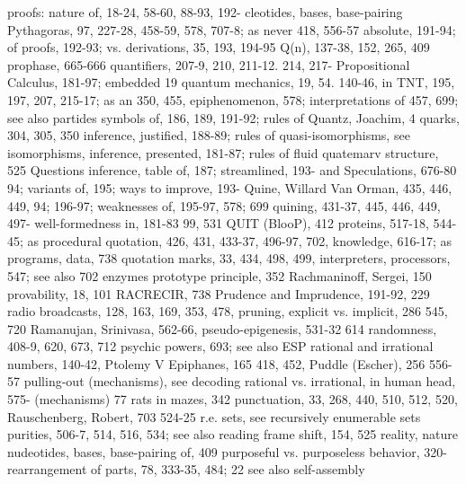 proofs: nature of, 18-24, 58-60, 88-93, 192-   cleotides, bases, base-pairing Pythagoras,
97, 227-28, 458-59, 578, 707-8; as never       418, 556-57
absolute, 191-94; of proofs, 192-93; vs.
derivations, 35, 193, 194-95                   Q(n), 137-38, 152, 265, 409
prophase, 665-666                              quantifiers, 207-9, 210, 211-12. 214, 217-
Propositional Calculus, 181-97; embedded       19 quantum mechanics, 19, 54. 140-46,
in TNT, 195, 197, 207, 215-17; as an           350, 455,
epiphenomenon, 578; interpretations of         457, 699; see also partides
symbols of, 186, 189, 191-92; rules of         Quantz, Joachim, 4 quarks, 304, 305, 350
inference, justified, 188-89; rules of         quasi-isomorphisms, see isomorphisms,
inference, presented, 181-87; rules of         fluid quatemarv structure, 525 Questions
inference, table of, 187; streamlined, 193-    and Speculations, 676-80
94; variants of, 195; ways to improve, 193-    Quine, Willard Van Orman, 435, 446, 449,
94; 196-97; weaknesses of, 195-97, 578;        699 quining, 431-37, 445, 446, 449, 497-
well-formedness in, 181-83                     99, 531 QUIT (BlooP), 412
proteins, 517-18, 544-45; as procedural        quotation, 426, 431, 433-37, 496-97, 702,
knowledge, 616-17; as programs, data,          738 quotation marks, 33, 434, 498, 499,
interpreters, processors, 547; see also        702
enzymes
prototype principle, 352                       Rachmaninoff, Sergei, 150
provability, 18, 101                           RACRECIR, 738
Prudence and Imprudence, 191-92, 229           radio broadcasts, 128, 163, 169, 353, 478,
pruning, explicit vs. implicit, 286            545, 720 Ramanujan, Srinivasa, 562-66,
pseudo-epigenesis, 531-32                      614 randomness, 408-9, 620, 673, 712
psychic powers, 693; see also ESP              rational and irrational numbers, 140-42,
Ptolemy V Epiphanes, 165                       418, 452,
Puddle (Escher), 256                           556-57
pulling-out (mechanisms), see decoding         rational vs. irrational, in human head, 575-
(mechanisms)                                   77 rats in mazes, 342
punctuation, 33, 268, 440, 510, 512, 520,      Rauschenberg, Robert, 703
524-25                                         r.e. sets, see recursively enumerable sets
purities, 506-7, 514, 516, 534; see also       reading frame shift, 154, 525 reality, nature
nudeotides, bases, base-pairing                of, 409
purposeful vs. purposeless behavior, 320-      rearrangement of parts, 78, 333-35, 484;
22                                             see also self-assembly
